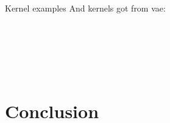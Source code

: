 \documentclass[19pt]{beamer}
\begin{document}
\begin{frame}{Kernel examples}
And kernels got from vae:\\

\begin{figure}
    \centering
    \begin{subfigure}%
        \texttt{[image: vaekernel1.png]}
    \end{subfigure}
    ~ %
    \begin{subfigure}%
        \texttt{[image: vaekernel2.png]}
        \label{fig:tiger}
    \end{subfigure}
    ~ %
    \begin{subfigure}%
        \texttt{[image: vaekernel3.png]}
        \label{fig:mouse}
    \end{subfigure}
     ~ %
    \begin{subfigure}%
        \texttt{[image: vaekernel4.png]}
        \label{fig:mouse}
    \end{subfigure}
    \label{fig:animals}
\end{figure}

\end{frame}





\section{Conclusion}
\end{document}
